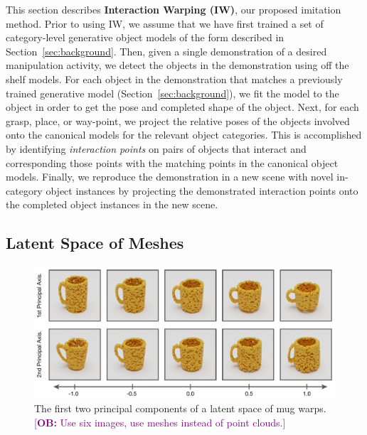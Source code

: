 \documentclass{article}
\newcommand{\ob}[1]{\textcolor{purple}{[\textbf{OB:} #1]}}
\begin{document}
This section describes \textbf{Interaction Warping (IW)}, our proposed imitation method. Prior to using IW, we assume that we have first trained a set of category-level generative object models of the form described in Section~\ref{sec:background}. Then, given a single demonstration of a desired manipulation activity, we detect the objects in the demonstration using off the shelf models. For each object in the demonstration that matches a previously trained generative model (Section~\ref{sec:background}), we fit the model to the object in order to get the pose and completed shape of the object. Next, for each grasp, place, or way-point, we project the relative poses of the objects involved onto the canonical models for the relevant object categories. This is accomplished by identifying \emph{interaction points} on pairs of objects that interact and corresponding those points with the matching points in the canonical object models. Finally, we reproduce the demonstration in a new scene with novel in-category object instances by projecting the demonstrated interaction points onto the completed object instances in the new scene.


\subsection{Latent Space of Meshes}
\label{sec:methods:mesh}

\begin{figure}
    \centering
    \includegraphics[width=\textwidth]{figures/latent_mugs2.pdf}
    \caption{The first two principal components of a latent space of mug warps. \ob{Use six images, use meshes instead of point clouds.}}
    \label{fig:latent}
\end{figure}
\end{document}
